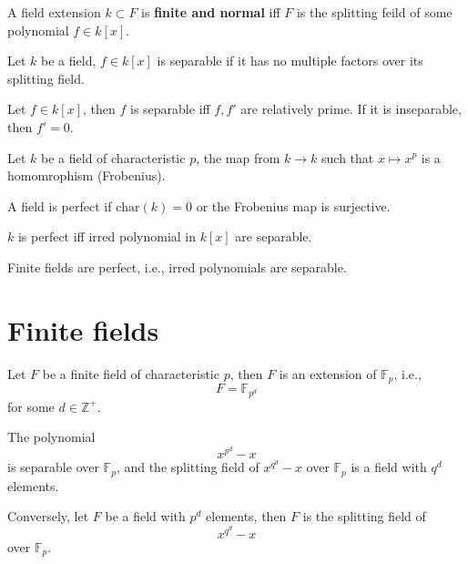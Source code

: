 \documentclass[openany]{book}
\newcommand{\Z}{\mathbb{Z}}
\newcommand{\F}{\mathbb{F}}
\begin{document}
\begin{prop}[normal]
    A field extension $k\subset F$ is \textbf{finite and normal} iff $F$ is the splitting feild of some polynomial $f\in k[x]$.
\end{prop}



\begin{defn}
    Let $k$ be a field, $f\in k[x]$ is separable if it has no multiple factors over its splitting field.
\end{defn}

\begin{prop}
    Let $f\in k[x]$, then $f$ is separable iff $f, f'$ are relatively prime. If it is inseparable, then $f'=0$.
\end{prop}



\begin{defn}
    Let $k$ be a field of characteristic $p$, the map from $k\to k$ such that $x\mapsto x^p$ is a homomrophism (Frobenius).

    A field is perfect if $\text{char}(k)=0$ or the Frobenius map is surjective.
\end{defn}

\begin{prop}
    $k$ is perfect iff irred polynomial in $k[x]$ are separable.
\end{prop}

\begin{cor}
    Finite fields are perfect, i.e., irred polynomials are separable.
\end{cor}


\section{Finite fields}
\begin{defn}
    Let $F$ be a finite field of characteristic $p$, then $F$ is an extension of $\F_{p}$, i.e., 
    \begin{equation*}
        F=\F_{p^d}
    \end{equation*}
    for some $d\in\Z^+$.
\end{defn}

\begin{thm}
    The polynomial
    \begin{equation*}
        x^{p^d}-x
    \end{equation*}
    is separable over $\F_p$, and the splitting field of $x^{q^d}-x$ over $\F_p$ is a field with $q^d$ elements. 

    Conversely, let $F$ be a field with $p^d$ elements, then $F$ is the splitting field of 
    \begin{equation*}
        x^{q^d}-x
    \end{equation*}
    over $\F_p$.
\end{thm}
\end{document}

